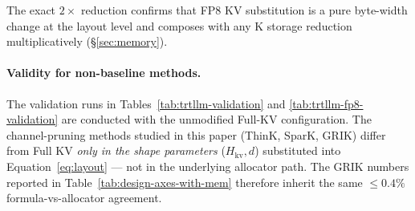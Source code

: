 \documentclass{article}
\begin{document}
The exact $2\times$ reduction confirms that FP8 KV substitution is a
pure byte-width change at the layout level and composes with any K
storage reduction multiplicatively (\S\ref{sec:memory}).
 
\paragraph{Validity for non-baseline methods.}
 
The validation runs in Tables~\ref{tab:trtllm-validation} and
\ref{tab:trtllm-fp8-validation} are conducted with the
unmodified Full-KV configuration. The channel-pruning methods studied
in this paper (ThinK, SparK, GRIK) differ from Full KV \emph{only in the
shape parameters} ($H_{\mathrm{kv}}, d$) substituted into
Equation~\ref{eq:layout} --- not in the underlying allocator path. The
GRIK numbers reported in Table~\ref{tab:design-axes-with-mem}
therefore inherit the same $\leq 0.4\%$
formula-vs-allocator agreement.
\end{document}

